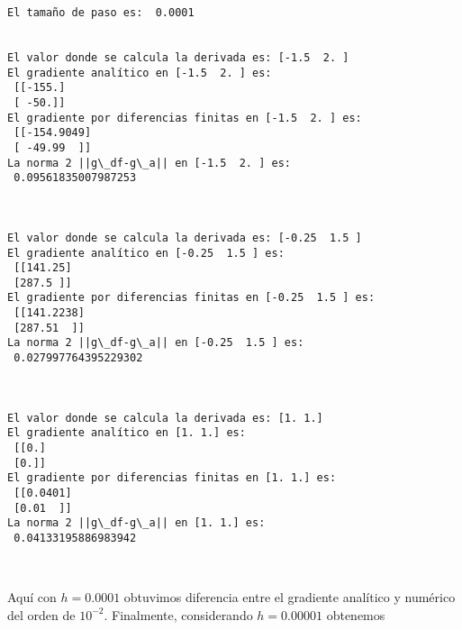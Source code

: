 \documentclass[11pt]{article}
\begin{document}
    \begin{Verbatim}[commandchars=\\\{\}]
El tamaño de paso es:  0.0001


El valor donde se calcula la derivada es: [-1.5  2. ]
El gradiente analítico en [-1.5  2. ] es:
 [[-155.]
 [ -50.]]
El gradiente por diferencias finitas en [-1.5  2. ] es:
 [[-154.9049]
 [ -49.99  ]]
La norma 2 ||g\_df-g\_a|| en [-1.5  2. ] es:
 0.09561835007987253



El valor donde se calcula la derivada es: [-0.25  1.5 ]
El gradiente analítico en [-0.25  1.5 ] es:
 [[141.25]
 [287.5 ]]
El gradiente por diferencias finitas en [-0.25  1.5 ] es:
 [[141.2238]
 [287.51  ]]
La norma 2 ||g\_df-g\_a|| en [-0.25  1.5 ] es:
 0.027997764395229302



El valor donde se calcula la derivada es: [1. 1.]
El gradiente analítico en [1. 1.] es:
 [[0.]
 [0.]]
El gradiente por diferencias finitas en [1. 1.] es:
 [[0.0401]
 [0.01  ]]
La norma 2 ||g\_df-g\_a|| en [1. 1.] es:
 0.04133195886983942



    \end{Verbatim}

    Aquí con \(h=0.0001\) obtuvimos diferencia entre el gradiente analítico
y numérico del orden de \(10^{-2}\). Finalmente, considerando
\(h=0.00001\) obtenemos
\end{document}
